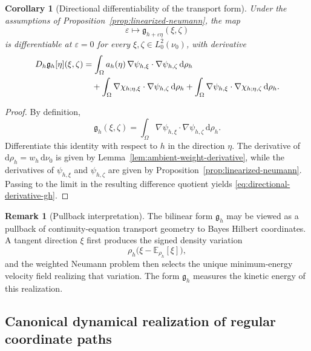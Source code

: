 \documentclass{article}
\newtheorem{corollary}[theorem]{Corollary}
\theoremstyle{definition}
\newtheorem{remark}[theorem]{Remark}
\renewcommand{\d}{\mathrm{d}}
\begin{document}
\begin{corollary}[Directional differentiability of the transport form]
    \label{cor:directional-derivative-gh}
    Under the assumptions of Proposition~\ref{prop:linearized-neumann}, the map
    \[
        \varepsilon\longmapsto \mathfrak g_{h+\varepsilon\eta}(\xi,\zeta)
    \]
    is differentiable at \(\varepsilon=0\) for every \(\xi,\zeta\in L^2_0(\nu_0)\), with derivative
    \begin{align}
        \label{eq:directional-derivative-gh}
        D_h \mathfrak g_h[\eta](\xi,\zeta)
         & =
        \int_\Omega
        a_h(\eta)\,
        \nabla\psi_{h,\xi}\cdot \nabla\psi_{h,\zeta}\, \d\rho_h \notag \\
         & \quad
        +
        \int_\Omega \nabla\chi_{h;\eta,\xi}\cdot \nabla\psi_{h,\zeta}\, \d\rho_h
        +
        \int_\Omega \nabla\psi_{h,\xi}\cdot \nabla\chi_{h;\eta,\zeta}\, \d\rho_h.
    \end{align}
\end{corollary}

\begin{proof}
    By definition,
    \[
        \mathfrak g_h(\xi,\zeta)
        =
        \int_\Omega
        \nabla\psi_{h,\xi}\cdot \nabla\psi_{h,\zeta}\, \d\rho_h.
    \]
    Differentiate this identity with respect to \(h\) in the direction \(\eta\). The derivative of
    \(\d\rho_h=w_h\,\d\nu_0\) is given by Lemma~\ref{lem:ambient-weight-derivative}, while
    the derivatives of \(\psi_{h,\xi}\) and \(\psi_{h,\zeta}\) are given by
    Proposition~\ref{prop:linearized-neumann}. Passing to the limit in the resulting difference
    quotient yields \eqref{eq:directional-derivative-gh}.
\end{proof}

\begin{remark}[Pullback interpretation]
    \label{rem:ambient-pullback-interpretation}
    The bilinear form \(\mathfrak g_h\) may be viewed as a pullback of continuity-equation transport
    geometry to Bayes Hilbert coordinates. A tangent direction \(\xi\) first produces the signed
    density variation
    \[
        \rho_h\bigl(\xi-\mathbb E_{\rho_h}[\xi]\bigr),
    \]
    and the weighted Neumann problem then selects the unique minimum-energy velocity field
    realizing that variation. The form \(\mathfrak g_h\) measures the kinetic energy of this
    realization.
\end{remark}

\subsection{Canonical dynamical realization of regular coordinate paths}
\end{document}
